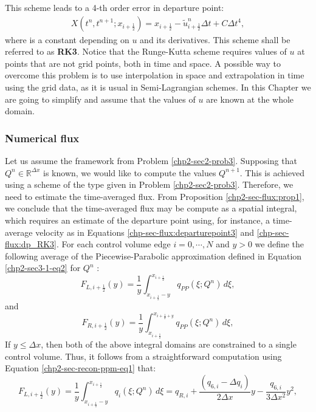 This scheme leads to a 4-th order error in departure point: 
\begin{align}		
	X(t^n,t^{n+1};x_{i+\frac{1}{2}}) = x_{i+\frac{1}{2}} - \tilde{u}^{n}_{i+\frac{1}{2}}\Delta t + C\Delta t^4,
\end{align}
where is a constant depending on $u$ and its derivatives.
This scheme shall be referred to as \textbf{RK3}.
Notice that the Runge-Kutta scheme requires values of $u$ at points that are not grid points, both in time and space. 
A possible way to overcome this problem is to use interpolation in space and extrapolation in time using the grid data, 
as it is usual in Semi-Lagrangian schemes. In this Chapter we are going to simplify and assume that the values of $u$ are known at the
whole domain.
\subsubsection{Numerical flux}
Let us assume the framework from Problem \ref{chp2-sec2-prob3}.
Supposing that $Q^{n} \in \mathbb{R}^{\Delta x}$ is known,
we would like to compute the values $Q^{n+1}$.
This is achieved using a scheme of the type given in Problem \ref{chp2-sec2-prob3}.
Therefore, we need to estimate the time-averaged flux. 
From Proposition \ref{chp2-sec-flux:prop1}, we conclude that the time-averaged flux
may be compute as a spatial integral, which requires an estimate of the departure point using, for instance,
a time-average velocity as in Equations \eqref{chp-sec-flux:departurepoint3} and \eqref{chp-sec-flux:dp_RK3}.
For each control volume edge $i=0, \cdots, N$ and $y>0$ 
we define the following average of the Piecewise-Parabolic approximation
defined in Equation \eqref{chp2-sec3-1-eq2} for $Q^{n}$ \citep{colella:1984}:
\begin{equation}
	\label{chp-sec-flux:fL_1}
	F_{L,i+\frac{1}{2}}(y) = \frac{1}{y} \int_{x_{i+\frac{1}{2}}-y}^{x_{i+\frac{1}{2}}}
	q_{PP}(\xi;Q^n)\,d\xi,
\end{equation}
and
\begin{equation}
	\label{chp-sec-flux:fR_1}
	F_{R,i+\frac{1}{2}}(y) = \frac{1}{y} \int_{x_{i+\frac{1}{2}}}^{x_{i+\frac{1}{2}+y}}
	q_{PP}(\xi;Q^n)\,d\xi,
\end{equation}
If $y \leq \Delta x$, then both of the above integral domains
are constrained to a single control volume. Thus,
it follows from a straightforward computation using 
Equation \eqref{chp2-sec-recon-ppm-eq1} that:
\begin{equation}
	\label{chp-sec-flux:fL_2}
	F_{L,i+\frac{1}{2}}(y) = \frac{1}{y} \int_{x_{i+\frac{1}{2}}-y}^{x_{i+\frac{1}{2}}}
	q_{i}(\xi;Q^n)\,d\xi = 
	q_{R,i} +\frac{(q_{6,i} - \Delta q_i)}{2\Delta x}y
	- \frac{q_{6,i}}{3\Delta x^2}y^2,
\end{equation}
